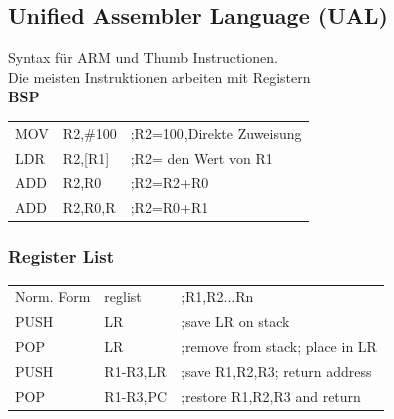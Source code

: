 \begin{multicols}{2}
    \begin{minipage}{\linewidth}
        \subsection{Unified Assembler Language (UAL)}
        Syntax für ARM und Thumb Instructionen.\\
        Die meisten Instruktionen arbeiten mit Registern\\
        \textbf{BSP}\newline
            \begin{tabular}{lll}
                MOV&R2,\#100  &;R2=100,Direkte Zuweisung  \\ 
                LDR&R2,[R1]  &;R2= den Wert von R1  \\ 
                ADD&R2,R0    &;R2=R2+R0  \\ 
                ADD&R2,R0,R  &;R2=R0+R1  \\ 
            \end{tabular} 
    \end{minipage}
    
    \begin{minipage}{0.8\linewidth}
        \subsubsection{Register List}
        \begin{tabular}{lll}
            Norm. Form&{reglist}  &;{R1,R2...Rn}  \\ 
            PUSH& {LR} & ;save LR on stack\\ 
            POP&  {LR}&  ;remove from stack; place in LR\\  
            PUSH& {R1-R3,LR} & ;save R1,R2,R3; return address\\  
            POP& {R1-R3,PC} &;restore R1,R2,R3 and return \\ 
        \end{tabular} 
    \end{minipage}
\end{multicols}
\clearpage

